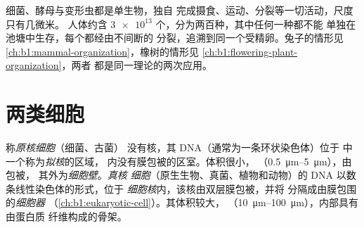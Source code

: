 \begin{example}[单细胞与多细胞]\label{ex:b1:cell-unit-of-life:onemany}
细菌、酵母与变形虫都是单生物，独自
完成摄食、运动、分裂等一切活动，尺度只有几微米。
人体约含 $\num{3e13}$ 个，分为两百种，其中任何一种都不能
单独在池塘中生存，每个都经由不间断的
分裂，追溯到同一个受精卵。兔子的情形见
\cref{ch:b1:mammal-organization}，橡树的情形见
\cref{ch:b1:flowering-plant-organization}，两者
都是同一理论的两次应用。
\end{example}

\section{两类细胞}

\begin{definition}[原核细胞与真核细胞]\label{def:b1:cell-unit-of-life:prokeuk}
称\emph{原核细胞}（细菌、古菌）
没有核，其 DNA（通常为一条环状染色体）位于
中一个称为\emph{拟核}的区域，
内没有膜包被的区室。体积很小，
（\qtyrange{0.5}{5}{\micro m}），由包被，
其外为\emph{细胞壁}。\emph{真核
细胞}（原生生物、真菌、植物和动物）的
DNA 以数条线性染色体的形式，位于
\emph{细胞核}内，该核由双层膜包被，并将
分隔成由膜包围的\emph{细胞器}
（\cref{ch:b1:eukaryotic-cell}）。其体积较大，
（\qtyrange{10}{100}{\micro m}），内部具有由蛋白质
纤维构成的骨架。
\end{definition}

